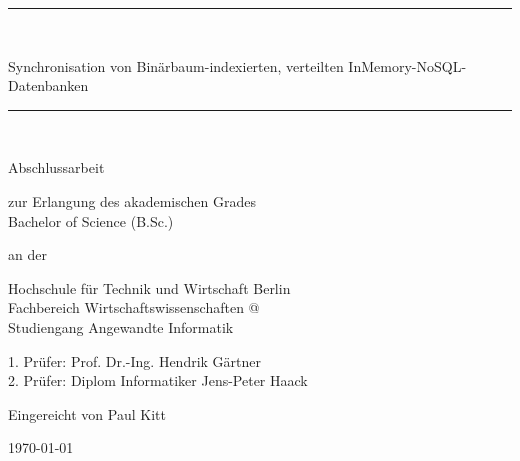 \documentclass[a4paper,11pt,oneside,%
headsepline,												%
footsepline,												%
bibtotocnumbered									%
]{scrreprt}
\makeatletter
\newcommand*{\rom}[1]{\expandafter\@slowromancap\romannumeral #1@}
\newcommand{\HRule}{\rule{\linewidth}{0.5mm}}
\makeatother
\begin{document}
\begin{titlepage}
\begin{center}
		 \vfill
		 \HRule \\[0.4cm]
	    {\bfseries\Large
	        \begin{LARGE}
	        Synchronisation von Binärbaum-indexierten, verteilten
			InMemory-NoSQL-Datenbanken\\
	        \end{LARGE} 
	    }    
		\HRule \\[1.5cm]
			\begin{minipage}{1.0\textwidth}
				\begin{flushleft}
				\Large	Abschlussarbeit
				\end{flushleft}
			\end{minipage}
			\vfill
			\begin{minipage}{1.0\textwidth}
				\begin{flushleft}
					\Large zur Erlangung des akademischen Grades\\
					\Large Bachelor of Science (B.Sc.)
				\end{flushleft}
			\end{minipage}
			\vfill
			\begin{minipage}{1.0\textwidth}
				\begin{flushleft}
					\Large an der
				\end{flushleft}
			\end{minipage}
			\vfill
			\begin{minipage}{1.0\textwidth}
				\begin{flushleft}
					\Large Hochschule für Technik und Wirtschaft Berlin\\
					\Large Fachbereich Wirtschaftswissenschaften \rom{2}\\
					\Large Studiengang Angewandte Informatik\\
				\end{flushleft}
			\end{minipage}
			\vfill
			\begin{minipage}{1.0\textwidth}
				\begin{flushleft}
					\Large 1. Prüfer: Prof. Dr.-Ing. Hendrik Gärtner\\
					\Large 2. Prüfer: Diplom Informatiker Jens-Peter Haack\\ 
				\end{flushleft}
			\end{minipage}
			\vfill
			\begin{minipage}{1.0\textwidth}
				\begin{flushleft}
					\Large Eingereicht von Paul Kitt
				\end{flushleft}
			\end{minipage}

		\vfill
		\begin{minipage}{1.0\textwidth}
			\begin{flushleft}
				{\Large \today}
			\end{flushleft}
		\end{minipage}
		\vfill

	\end{center}
\end{titlepage}
\end{document}
